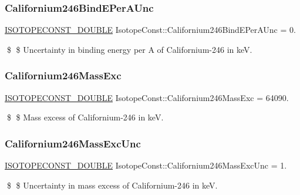 \subsubsection{\texorpdfstring{Californium246\+Bind\+E\+Per\+A\+Unc}{Californium246BindEPerAUnc}}
{\footnotesize\ttfamily \mbox{\hyperlink{group___isotope_const-_macros_ga8f45a7272ce02c0b4c65c44636ed719a}{I\+S\+O\+T\+O\+P\+E\+C\+O\+N\+S\+T\+\_\+\+D\+O\+U\+B\+LE}} Isotope\+Const\+::\+Californium246\+Bind\+E\+Per\+A\+Unc = 0.}

\$ \$ Uncertainty in binding energy per A of Californium-\/246 in keV. \mbox{\label{group___isotope_const-_californium-_cf246_gaa2b5bdee09f2ef1ed0b7ef9037cd509c}} 
\subsubsection{\texorpdfstring{Californium246\+Mass\+Exc}{Californium246MassExc}}
{\footnotesize\ttfamily \mbox{\hyperlink{group___isotope_const-_macros_ga8f45a7272ce02c0b4c65c44636ed719a}{I\+S\+O\+T\+O\+P\+E\+C\+O\+N\+S\+T\+\_\+\+D\+O\+U\+B\+LE}} Isotope\+Const\+::\+Californium246\+Mass\+Exc = 64090.}

\$ \$ Mass excess of Californium-\/246 in keV. \mbox{\label{group___isotope_const-_californium-_cf246_ga9ea894ce7c7005ca7ac11b53ee07dc5d}} 
\subsubsection{\texorpdfstring{Californium246\+Mass\+Exc\+Unc}{Californium246MassExcUnc}}
{\footnotesize\ttfamily \mbox{\hyperlink{group___isotope_const-_macros_ga8f45a7272ce02c0b4c65c44636ed719a}{I\+S\+O\+T\+O\+P\+E\+C\+O\+N\+S\+T\+\_\+\+D\+O\+U\+B\+LE}} Isotope\+Const\+::\+Californium246\+Mass\+Exc\+Unc = 1.}

\$ \$ Uncertainty in mass excess of Californium-\/246 in keV. \mbox{\label{group___isotope_const-_californium-_cf246_gadf7dca0e4133d5f64779f8906721d46d}} 
